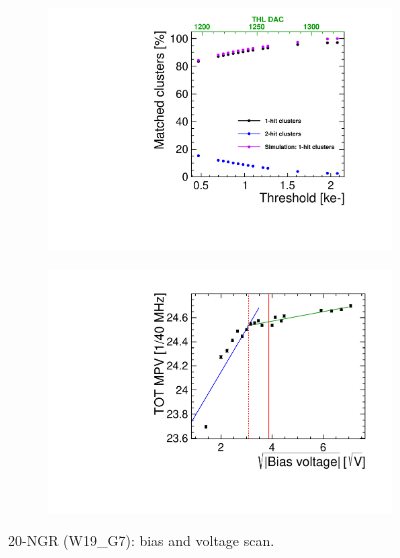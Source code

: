 \begin{figure}[htbp] \centering
  \begin{subfigure}[b]{0.45\textwidth}
    \includegraphics[width=\textwidth]{./figures/TestBeam/ThresholdScan_W0019_G07.pdf}
    \caption{}
  \end{subfigure} \hfill
  \begin{subfigure}[b]{0.45\textwidth}
    \includegraphics[width=\textwidth]{./figures/TestBeam/depletionVoltage_W0019_G07.pdf}
    \caption{}
  \end{subfigure}
  \caption{20-NGR (W19\_G7): bias and voltage scan.}
  \label{fig:Timepix3_THLscan_Vdep_G7}
\end{figure}

